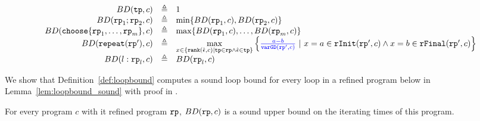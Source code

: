 \begin{defn}
\label{def:loopbound}
  \[
    \begin{array}{rcl}
      BD(\tpath, c) & \triangleq & 1 \\
      BD(\rprog_1;\rprog_2, c) & \triangleq & \min \left\{BD(\rprog_1, c), BD(\rprog_2, c) \right\} \\
      BD(\rpchoose{\rprog_1, \ldots, \rprog_m }, c) & \triangleq 
      & \max\left\{ BD(\rprog_1, c), \ldots, BD(\rprog_m, c) \right\} \\
      BD(\rprepeat(\rprog'), c) & \triangleq 
      &
      \max\limits_{x \in \left\{ \locbound(\absevent, c) | \tpath \in \rprog \land \absevent \in \tpath \right\}}
      \Big\{ \highlight{\frac{a - b}{\varGD(\rprog', c)}} ~\vert~
      x = a \in \rfinit(\rprog', c)
      \land x = b \in \rffinal(\rprog', c)
      \Big\} 
      \\
      BD(l: \rprog_l, c) & \triangleq & BD(\rprog_l, c)
    \end{array}
  \]
\end{defn}
We show that Definition~\ref{def:loopbound} computes a sound loop bound for every loop in a refined program below in Lemma~\ref{lem:loopbound_sound} with proof in .
\begin{lem}
  \label{lem:loopbound_sound}
  For every program $c$ with it refined program $\mathtt{rp}$,
  $BD(\mathtt{rp}, c)$ is a sound upper bound on the iterating times of this program.
\end{lem}


